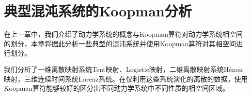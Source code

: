 \chapter{典型混沌系统的Koopman分析}
在上一章中，我们介绍了动力学系统的概念与Koopman算符对动力学系统相空间的划分，本章将据此分析一些典型的混沌系统并使用Koopman算符对其相空间进行划分。

我们分析了一维离散映射系统Tent映射、Logistic映射，二维离散映射系统H\'{e}non映射，三维连续时间系统Lorenz系统。在仅利用这些系统演化的离散的数据，使用Koopman算符能够较好的区分出不同动力学系统中不同性质的相空间区域。


\clearpage

\clearpage

\clearpage




% 
% 

